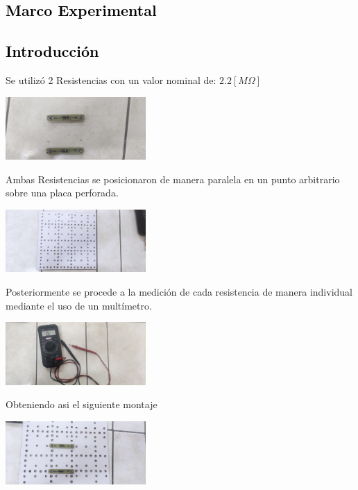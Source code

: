 \documentclass[11pt]{article}
\begin{document}
\begin{multicols}{2}
        \section{\textbf{\textcolor{black}{Marco Experimental}}}

        \subsection{\textbf{\textcolor{black}{Introducción}}}
        \noindent Se utilizó 2 Resistencias con un valor nominal de: $2.2 [M\Omega]$
        \begin{center}
            \includegraphics[width=0.4\textwidth]{img-1/res}
        \end{center}
        \noindent  Ambas Resistencias se posicionaron de manera paralela en un punto arbitrario
        sobre una placa perforada.
        \begin{center}
            \includegraphics[width=0.4\textwidth]{img-1/board}
        \end{center}
        \noindent Posteriormente se procede a la medición de cada resistencia de manera individual mediante el uso
        de un multímetro.
        \begin{center}
            \includegraphics[width=0.4\textwidth]{img-1/multimeter}
        \end{center}
        \noindent Obteniendo asi el siguiente montaje
        \begin{center}
            \includegraphics[width=0.4\textwidth]{img-1/setup}
        \end{center}


\end{multicols}
\end{document}
